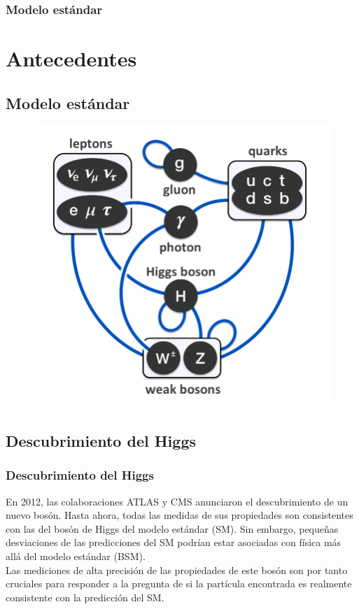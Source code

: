 \documentclass[11pt]{beamer}
\begin{document}
\begin{frame}
\frametitle{Modelo est\'andar}
\section{Antecedentes}
\subsection{Modelo est\'andar}
\begin{center}
\begin{figure}[ht]
	\includegraphics[scale=0.25]{sm.png}
\end{figure}
\end{center}
\end{frame}

\begin{frame}
\subsection{Descubrimiento del Higgs}
\frametitle{Descubrimiento del Higgs}
En 2012, las colaboraciones ATLAS y CMS anunciaron el descubrimiento de un nuevo bosón. Hasta ahora, todas las medidas de sus propiedades son consistentes con las del bosón de Higgs del modelo estándar (SM). 
Sin embargo, pequeñas desviaciones de las predicciones del SM podrían 
estar asociadas con física más allá del modelo estándar (BSM). \\

Las mediciones de alta  precisi\'on de las propiedades de este bos\'on son por tanto cruciales para responder a la pregunta de si la partícula encontrada es realmente consistente con la predicci\'on del SM.
\end{frame}
\end{document}
